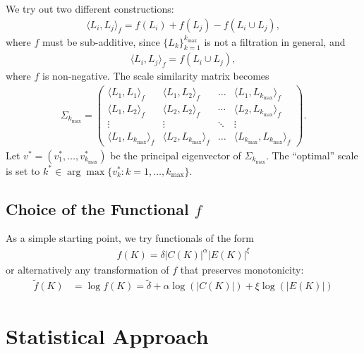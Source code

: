 We try out two different constructions:
\begin{align*}
    \langle L_i, L_j\rangle_f=f(L_i)+f(L_j)-f(L_i\cup L_j),
\end{align*}
where $f$ must be sub-additive, since $\{L_k\}_{k=1}^{k_{\max}}$ is not a filtration in general, and
\begin{align*}
    \langle L_i,L_j \rangle_f=f(L_i\cup L_j),
\end{align*}
where $f$ is non-negative. The scale similarity matrix becomes
\begin{align*}
    \Sigma_{k_{\max}}=\begin{pmatrix}
        \langle L_1, L_1\rangle_f & \langle L_1, L_2\rangle_f & \dots & \langle L_1, L_{k_{\max}}\rangle_f\\
        \langle L_1, L_2\rangle_f & \langle L_2, L_2\rangle_f & \cdots & \langle L_2, L_{k_{\max}}\rangle_f\\
        \vdots & \vdots & \ddots & \vdots\\
        \langle L_1, L_{k_{\max}}\rangle_f & \langle L_2, L_{k_{\max}}\rangle_f & \dots & \langle L_{k_{\max}}, L_{k_{\max}}\rangle_f
    \end{pmatrix}.
\end{align*}
Let $v^*=(v^*_1,\dots,v^*_{k_{\max}})$ be the principal eigenvector of $\Sigma_{k_{\max}}$. The \enquote{optimal} scale is set to $k^{*}\in\arg\max\{v^*_k:k=1,\dots,k_{\max}\}$.

\subsection*{Choice of the Functional $f$}

As a simple starting point, we try functionals of the form
\begin{align*}
    f(K)=\delta|C(K)|^{\alpha}|E(K)|^{\xi}
\end{align*}
or alternatively any transformation of $f$ that preserves monotonicity:
\begin{align*}
    \tilde{f}(K)&=\log{f(K)}=\tilde{\delta}+\alpha\log{\left(|C(K)|\right)}+\xi\log{\left(|E(K)|\right)}
\end{align*}



\section*{Statistical Approach}


